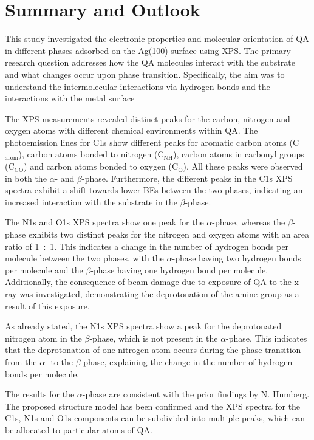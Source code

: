 \chapter{Summary and Outlook}

This study investigated the electronic properties and molecular orientation of \ac{QA} in different phases adsorbed on the Ag(100) surface using \ac{XPS}. The primary research question addresses how the \ac{QA} molecules interact with the substrate and what changes occur upon phase transition. Specifically, the aim was to understand the intermolecular interactions via hydrogen bonds and the interactions with the metal surface

The \ac{XPS} measurements revealed distinct peaks for the carbon, nitrogen and oxygen atoms with different chemical environments within \ac{QA}. The photoemission lines for C1s show different peaks for aromatic carbon atoms (C$_{\text{arom}}$), carbon atoms bonded to nitrogen (C$_{\text{NH}}$), carbon atoms in carbonyl groups (C$_{\text{CO}}$) and carbon atoms bonded to oxygen (C$_{\text{O}}$). All these peaks were observed in both the $\alpha$- and $\beta$-phase. Furthermore, the different peaks in the C1s \ac{XPS} spectra exhibit a shift towards lower \acp{BE} between the two phases, indicating an increased interaction with the substrate in the $\beta$-phase.

The N1s and O1s \ac{XPS} spectra show one peak for the $\alpha$-phase, whereas the $\beta$-phase exhibits two distinct peaks for the nitrogen and oxygen atoms with an area ratio of 1~:~1. This indicates a change in the number of hydrogen bonds per molecule between the two phases, with the $\alpha$-phase having two hydrogen bonds per molecule and the $\beta$-phase having one hydrogen bond per molecule. Additionally, the consequence of beam damage due to exposure of \ac{QA} to the x-ray was investigated, demonstrating the deprotonation of the amine group as a result of this exposure.

As already stated, the N1s \ac{XPS} spectra show a peak for the deprotonated nitrogen atom in the $\beta$-phase, which is not present in the $\alpha$-phase. This indicates that the deprotonation of one nitrogen atom occurs during the phase transition from the $\alpha$- to the $\beta$-phase, explaining the change in the number of hydrogen bonds per molecule.

The results for the $\alpha$-phase are consistent with the prior findings by N. Humberg.\autocite{Humberg2024,Humberg2020} The proposed structure model has been confirmed and the \ac{XPS} spectra for the C1s, N1s and O1s components can be subdivided into multiple peaks, which can be allocated to particular atoms of \ac{QA}.

